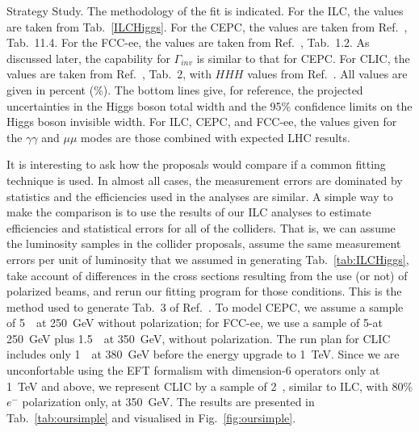 \begin{table}[!htbp]
{  Strategy Study.  The methodology of the fit is indicated. 
 For the ILC, the  values are taken from
  Tab.~\ref{ILCHiggs}.    For the CEPC, the values are taken from
  Ref.~\cite{CEPCStudyGroup:2018ghi}, Tab.~11.4.  For the FCC-ee, the values are taken
  from Ref.~\cite{Benedikt:2018qee}, Tab.~1.2. As discussed later,
  the capability for $\Gamma_{inv}$  is similar to that for CEPC. 
 For CLIC, the values are taken from 
Ref.~\cite{Charles:2018vfv}, Tab.~2, with $HHH$ values from
Ref.~\cite{Roloff:2019crr}.
  All values
  are given in percent (\%). The
  bottom lines give, for reference, the projected uncertainties in the
  Higgs boson total width and the 95\% confidence limits on the Higgs
  boson invisible width.  For  ILC, CEPC, and FCC-ee, the 
 values given for the $\gamma\gamma$ and $\mu\mu$ modes are those
 combined with expected
LHC results.}
\end{table}



It is interesting to ask how the proposals would compare if a common
fitting technique is used. In almost all cases, the measurement errors
are dominated by statistics and the efficiencies used in the analyses
are similar.  A simple way to make the comparison is  to use
the results of our ILC analyses to estimate efficiencies and
statistical errors for all of the colliders.  That is, we can  assume
the luminosity samples in the collider proposals, assume the same
measurement errors per unit of luminosity that we assumed in
generating Tab.~\ref{tab:ILCHiggs},  take account of differences in
the cross sections resulting from the use (or not) of polarized beams,
and rerun our fitting  program for those conditions.   This is the
method used to generate 
Tab.~3 of Ref.~\cite{Barklow:2017suo}.  To model CEPC, we assume
 a sample of  5~\iab\ at 250~GeV without polarization; for 
FCC-ee, we use a sample of 5-\iab at 250~GeV plus 1.5~\iab\ at 350~GeV,
without polarization.  The run plan for CLIC includes only 1~\iab\ at
380~GeV before the energy upgrade to 1~TeV.  Since we are
unconfortable using the EFT formalism
 with dimension-6 operators only at 1~TeV and above, we represent CLIC by a sample of
2~\iab, similar to ILC, with 80\% $e^-$ polarization only, at 350~GeV.  
The results are presented in Tab.~\ref{tab:oursimple} and visualised in Fig.~\ref{fig:oursimple}.  


